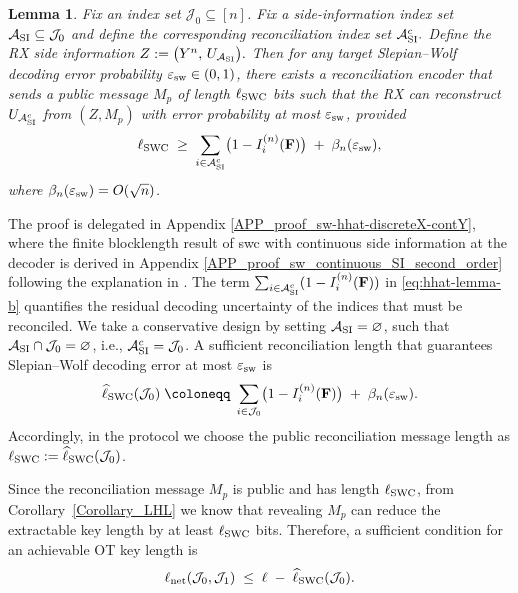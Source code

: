 \documentclass[onecolumn]{IEEEtran} %
\newcommand{\bF}{\mathbf F}
\newcommand{\1}{\mathbbm{1}}
\theoremstyle{boldremark}
\newtheorem{lemma}{Lemma}
\begin{document}
\begin{lemma}\label{lem:sw-hhat-discreteX-contY}
Fix an index set $\mathcal J_0\subseteq[n]$.
Fix a side-information index set $\mathcal A_{\rm SI}\subseteq\mathcal J_0$ and define the corresponding
reconciliation index set
$\mathcal A_{\rm SI}^c.$ Define the RX side information $Z := \bigl(Y^n,\,U_{\mathcal A_{\rm SI}}\bigr).$
Then for any target Slepian--Wolf decoding error probability
$\varepsilon_{\rm sw}\in(0,1)$, there exists a
reconciliation encoder that sends a public message $M_{p}$ of length
$\ell_{\rm SWC}$ bits such that the RX can reconstruct
$U_{\mathcal A_{\rm SI}^c}$ from $(Z,M_{p})$ with error probability at
most $\varepsilon_{\rm sw}$, provided
\begin{equation}\label{eq:hhat-lemma-b}
  \ell_{\rm SWC}\;\ge\;
  \sum_{i\in\mathcal A_{\rm SI}^c}\bigl(1-I_i^{(n)}(\bF)\bigr)
  \;+\;
  \beta_n(\varepsilon_{\rm sw}),
\end{equation}
where $\beta_n(\varepsilon_{\rm sw})=O(\sqrt{n})$.
\end{lemma}



The proof is delegated in Appendix
\ref{APP_proof_sw-hhat-discreteX-contY}, where the finite blocklength result of \gls{swc} with continuous side information at the decoder is derived in Appendix \ref{APP_proof_sw_continuous_SI_second_order} following the explanation in
\cite[Remark~1]{Hayashi_SWC_Entropy20}.
The term $\sum_{i\in\mathcal{A}_{\rm SI}^c}(1-I_i^{(n)}(\bF))$ in
\eqref{eq:hhat-lemma-b} quantifies the residual decoding uncertainty of the indices
that must be reconciled. We take a conservative design by setting $\mathcal A_{\rm SI}=\varnothing$, such that
$\mathcal A_{\rm SI}\cap\mathcal J_0=\varnothing$, i.e., $\mathcal{A}_{\rm SI}^c=\mathcal J_0$.
A sufficient reconciliation length that guarantees Slepian--Wolf decoding error at most
$\varepsilon_{\rm sw}$ is
\begin{equation}\label{eq:hhat}
\widehat{\ell}_{\rm SWC}(\mathcal J_0)
\;\coloneqq\;
\sum_{i\in\mathcal J_0}\bigl(1-I_i^{(n)}(\bF)\bigr)\;+\;\beta_n(\varepsilon_{\rm sw}).
\end{equation}
Accordingly, in the protocol we choose the public reconciliation message length as
$\ell_{\rm SWC}:=\widehat{\ell}_{\rm SWC}(\mathcal J_0)$.

Since the reconciliation message $M_p$ is public and has length $\ell_{\rm SWC}$, from Corollary~\ref{Corollary_LHL} we know that revealing $M_p$ can reduce the extractable key length by at least $\ell_{\rm SWC}$ bits.
Therefore, a sufficient condition for an achievable OT key length is
\begin{equation}\label{eq:ell-net-derivation-1}
\ell_{\rm net}(\mathcal J_0,\mathcal J_1)
\;\le\;
\ell \;-\; \widehat{\ell}_{\rm SWC}(\mathcal J_0).
\end{equation}
\end{document}
